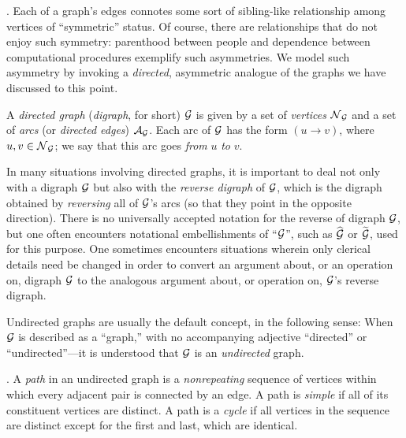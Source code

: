 \bigskip

 
 

.
Each of a graph's edges connotes some sort of sibling-like relationship among vertices of ``symmetric'' status.  Of course, there are relationships that do not enjoy such symmetry: parenthood between people and dependence between computational procedures exemplify such asymmetries.  We model such asymmetry by invoking a {\em directed}, asymmetric analogue of the graphs we have discussed to this point.

\smallskip

A {\it directed graph} ({\it digraph}, for short) $\mbox{$\cal G$}$ is given by a set of {\it vertices} $\mbox{$\cal N$}_{\mbox{{\scriptsize $\cal G$}}}$ and a set of {\it arcs} (or {\it directed edges}) $\mbox{$\cal A$}_{\mbox{{\scriptsize $\cal G$}}}$.  Each arc of $\mbox{$\cal G$}$ has the form $(u \rightarrow v)$, where $u, v \in \mbox{$\cal N$}_{\mbox{{\scriptsize $\cal G$}}}$; we say that this arc goes {\em from} $u$ {\em to} $v$.  

\smallskip

In many situations involving directed graphs, it is important to deal not only with a digraph $\mbox{$\cal G$}$
but also with the {\em reverse digraph} of $\mbox{$\cal G$}$, which is the digraph obtained by {\em reversing}
all of $\mbox{$\cal G$}$'s arcs (so that they point in the opposite direction).  There is no universally accepted 
notation for the reverse of digraph $\mbox{$\cal G$}$, but one often encounters notational embellishments of ``$\mbox{$\cal G$}$'', such as $\widehat{\mbox{$\cal G$}}$ or $\widetilde{\mbox{$\cal G$}}$, used for this purpose.  One sometimes encounters situations wherein only clerical details need be changed in order to convert an argument about, or an operation on, digraph $\mbox{$\cal G$}$  to the analogous argument  about, or operation on, $\mbox{$\cal G$}$'s reverse digraph. 

\medskip

Undirected graphs are usually the default concept, in the following sense: When $\mbox{$\cal G$}$ is described as a ``graph,'' with no accompanying adjective ``directed'' or ``undirected''---it is understood that $\mbox{$\cal G$}$ is an {\em undirected} graph.

\medskip

 
 
 

.
A {\em path} in an undirected graph is a {\em nonrepeating} sequence of vertices within which
every adjacent pair is connected by an edge.  A path is {\em simple} if all of its constituent vertices are distinct.  A path is a {\em cycle} if all vertices in the sequence are distinct except for the first and last, which are identical.  

